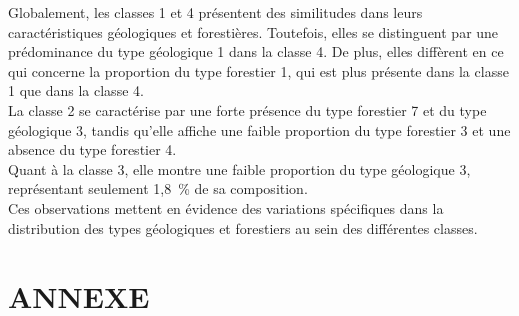 \documentclass{article}
\begin{document}
Globalement, les classes 1 et 4 présentent des similitudes dans leurs caractéristiques géologiques et forestières. Toutefois, elles se distinguent par une prédominance du type géologique 1 dans la classe 4. De plus, elles diffèrent en ce qui concerne la proportion du type forestier 1, qui est plus présente dans la classe 1 que dans la classe 4.
\\
La classe 2 se caractérise par une forte présence du type forestier 7 et du type géologique 3, tandis qu'elle affiche une faible proportion du type forestier 3 et une absence du type forestier 4.
\\
Quant à la classe 3, elle montre une faible proportion du type géologique 3, représentant seulement 1,8~\% de sa composition.
\\
Ces observations mettent en évidence des variations spécifiques dans la distribution des types géologiques et forestiers au sein des différentes classes.


\newpage
\section{ANNEXE}



\end{document}
